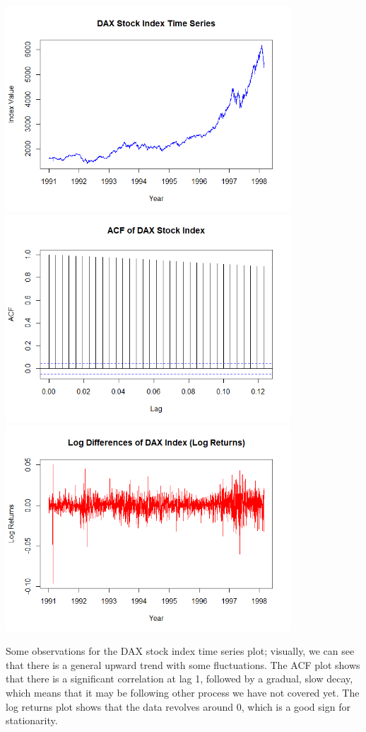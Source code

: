 \documentclass[12pt]{article}
\begin{document}
\begin{enumerate}
\begin{verbatim}
    \end{verbatim}
    \begin{center}
        \includegraphics[width=0.8\textwidth]{Rplot03.png}
        \includegraphics[width=0.8\textwidth]{Rplot04.png}
        \includegraphics[width=0.8\textwidth]{Rplot05.png}
    \end{center}
    Some observations for the DAX stock index time series plot; visually, we can see that
    there is a general upward trend with some fluctuations. The ACF plot shows that there is
    a significant correlation at lag 1, followed by a gradual, slow decay, which means that it
    may be following other process we have not covered yet. The log returns plot shows that 
    the data revolves around 0, which is a good sign for stationarity.


\end{enumerate}
\end{document}
